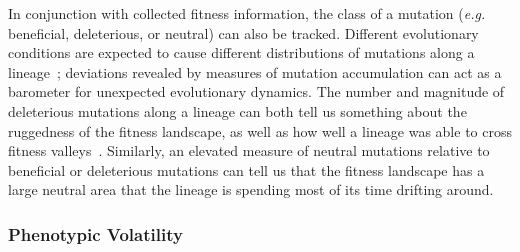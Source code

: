 \documentclass[letterpaper]{article}
\begin{document}
In conjunction with collected fitness information, the class of a mutation (\textit{e.g.} beneficial, deleterious, or neutral) can also be tracked. Different evolutionary conditions are expected to cause different distributions of mutations along a lineage~\citep{barrick2013genome}; deviations revealed by measures of mutation accumulation can act as a barometer for unexpected evolutionary dynamics.  
The number and magnitude of deleterious mutations along a lineage can both tell us something about the ruggedness of the fitness landscape, as well as how well a lineage was able to cross fitness valleys~\citep{covert_experiments_2013}. 
Similarly, an elevated measure of neutral mutations relative to beneficial or deleterious mutations can tell us that the fitness landscape has a large neutral area that the lineage is spending most of its time drifting around. 



\subsubsection{Phenotypic Volatility}
\end{document}
